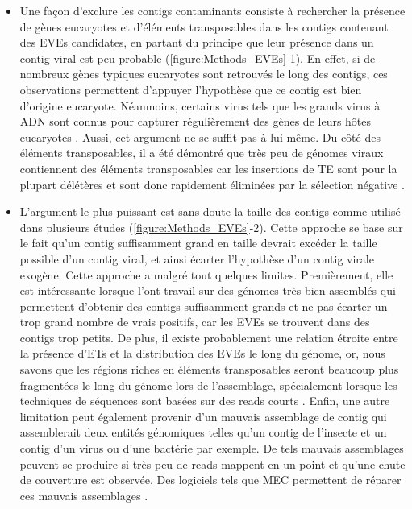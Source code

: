 \begin{itemize}

    \item Une façon d'exclure les contigs contaminants consiste à rechercher la présence de gènes eucaryotes et d'éléments transposables dans les contigs contenant des EVEs candidates, en partant du principe que leur présence dans un contig viral est peu probable (\figurename{\ref{figure:Methods_EVEs}}-1). En effet, si de nombreux gènes typiques eucaryotes sont retrouvés le long des contigs, ces observations permettent d'appuyer l'hypothèse que ce contig est bien d'origine eucaryote. Néanmoins, certains virus tels que les grands virus à ADN sont connus pour capturer régulièrement des gènes de leurs hôtes eucaryotes \citep{irwin_systematic_2022}. Aussi, cet argument ne se suffit pas à lui-même. Du côté des éléments transposables, il a été démontré que très peu de génomes viraux contiennent des éléments transposables \citep{miller_virus_1982,gilbert_population_2014,gilbert_continuous_2016,gilbert_viruses_2017,loiseau_wide_2020} car les insertions de TE sont pour la plupart délétères et sont donc rapidement éliminées par la sélection négative \citep{gilbert_continuous_2016, gilbert_viruses_2017}. 

    \item L'argument le plus puissant est sans doute la taille des contigs comme utilisé dans plusieurs études \citep{gilbert_diversity_2022,shen_tempo_2018,li_hgt_2022-1} (\figurename{\ref{figure:Methods_EVEs}}-2). Cette approche se base sur le fait qu'un contig suffisamment grand en taille devrait excéder la taille possible d'un contig viral, et ainsi écarter l'hypothèse d'un contig virale exogène. Cette approche a malgré tout quelques limites. Premièrement, elle est intéressante lorsque l'ont travail sur des génomes très bien assemblés qui permettent d'obtenir des contigs suffisamment grands et ne pas écarter un trop grand nombre de vrais positifs, car les EVEs se trouvent dans des contigs trop petits. De plus, il existe probablement une relation étroite entre la présence d'ETs et la distribution des EVEs le long du génome, or, nous savons que les régions riches en éléments transposables seront beaucoup plus fragmentées le long du génome lors de l'assemblage, spécialement lorsque les techniques de séquences sont basées sur des reads courts \citep{peona_identifying_2021}. Enfin, une autre limitation peut également provenir d'un mauvais assemblage de contig qui assemblerait deux entités génomiques telles qu'un contig de l'insecte et un contig d'un virus ou d'une bactérie par exemple. De tels mauvais assemblages peuvent se produire si très peu de reads mappent en un point et qu'une chute de couverture est observée. Des logiciels tels que MEC permettent de réparer ces mauvais assemblages \citep{wu_mec_2020}.


\end{itemize}
